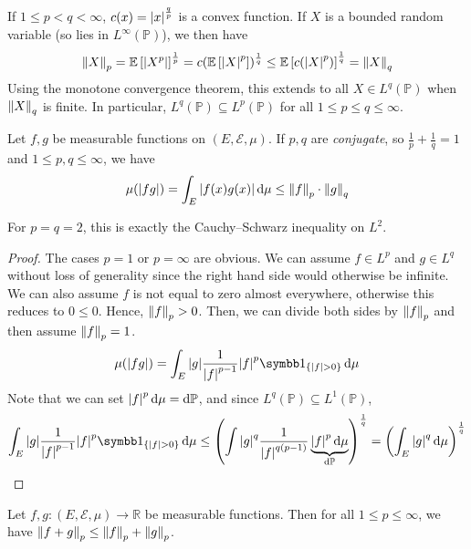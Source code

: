 \begin{remark}
	If \( 1 \leq p < q < \infty \), \( c(x) = \abs{x}^{\frac{q}{p}} \) is a convex function.
	If \( X \) is a bounded random variable (so lies in \( L^\infty(\mathbb P) \)), we then have
	\[ \norm{X}_p = \mathbb{E}\left[{\abs{X^p}}\right]^{\frac{1}{p}} = c(\mathbb{E}\left[{\abs{X}^p}\right])^{\frac{1}{q}} \leq \mathbb{E}\left[{c(\abs{X}^p)}\right]^{\frac{1}{q}} = \norm{X}_q \]
	Using the monotone convergence theorem, this extends to all \( X \in L^q(\mathbb P) \) when \( \norm{X}_q \) is finite.
	In particular, \( L^q(\mathbb P) \subseteq L^p(\mathbb P) \) for all \( 1 \leq p \leq q \leq \infty \).
\end{remark}
\begin{theorem}
	Let \( f, g \) be measurable functions on \( (E,\mathcal E,\mu) \).
	If \( p, q \) are \emph{conjugate}, so \( \frac{1}{p} + \frac{1}{q} = 1 \) and \( 1 \leq p, q \leq \infty \), we have
	\[ \mu(\abs{fg}) = \int_E \abs{f(x)g(x)} \dd{\mu} \leq \norm{f}_p \cdot \norm{g}_q \]
\end{theorem}
\begin{remark}
	For \( p = q = 2 \), this is exactly the Cauchy--Schwarz inequality on \( L^2 \).
\end{remark}
\begin{proof}
	The cases \( p = 1 \) or \( p = \infty \) are obvious.
	We can assume \( f \in L^p \) and \( g \in L^q \) without loss of generality since the right hand side would otherwise be infinite.
	We can also assume \( f \) is not equal to zero almost everywhere, otherwise this reduces to \( 0 \leq 0 \).
	Hence, \( \norm{f}_p > 0 \).
	Then, we can divide both sides by \( \norm{f}_p \) and then assume \( \norm{f}_p = 1 \).
	\[ \mu(\abs{fg}) = \int_E \abs{g} \frac{1}{\abs{f}^{p-1}} \abs{f}^p \symbb 1_{\qty{\abs{f} > 0}} \dd{\mu} \]
	Note that we can set \( \abs{f}^p \dd{\mu} = \dd{\mathbb P} \), and since \( L^q(\mathbb P) \subseteq L^1(\mathbb P) \),
	\[ \int_E \abs{g} \frac{1}{\abs{f}^{p-1}} \abs{f}^p \symbb 1_{\qty{\abs{f} > 0}} \dd{\mu} \leq \qty( \int \abs{g}^q \frac{1}{\abs{f}^{q(p-1)}} \underbrace{\abs{f}^p \dd{\mu}}_{\dd{\mathbb P}})^{\frac{1}{q}} = \qty(\int_E \abs{g}^q \dd{\mu})^{\frac{1}{q}} \]
\end{proof}
\begin{theorem}
	Let \( f, g \colon (E, \mathcal E, \mu) \to \mathbb R \) be measurable functions.
	Then for all \( 1 \leq p \leq \infty \), we have \( \norm{f + g}_p \leq \norm{f}_p + \norm{g}_p \).
\end{theorem}
